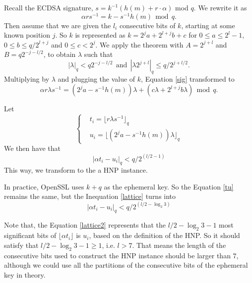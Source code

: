 Recall the ECDSA signature, $s = k^{-1} (h(m) + r\cdot\alpha)$ mod $q$.
We rewrite it as
\begin{equation}
\label{sig}
\alpha rs^{-1} = k - s^{-1}h(m)  \ \  \text{mod} \ \ q.
\end{equation}
Then assume that we are given the $l_i$ consecutive bits of $k$, starting at some known position $j$.
 So $k$ is represented as $k = 2^{j}a + 2^{l+j}b +c$ for $0 \leq a \leq 2^l -1$, $0\leq b \leq q/2^{l+j}$ and $0 \leq c < 2^j$.
 We apply the theorem with $A = 2^{j+l}$ and $B = q2^{-j-l/2}$, to obtain $\lambda$ such that
$$
|\lambda |_q < q2^{-j-l/2}  \ \  \text{and} \ \  |\lambda 2^{j+l}|_q \leq q/2^{j+l/2} .
$$
Multiplying by $\lambda$ and plugging the value of $k$, Equation \ref{sig} transformed to
$$
\alpha r\lambda s^{-1} = (2^{j}a - s^{-1}h(m))\lambda +(c\lambda + 2^{l+j}b\lambda)  \ \  \text{mod} \ \ q.
$$

 Let
 \begin{equation}
 \label{tu}
 \left\{
 \begin{aligned}
 	&t_i = \lfloor r\lambda s^{-1} \rfloor_q    \\
 	&u_i = \lfloor (2^{j}a - s^{-1}h(m))\lambda \rfloor_q
 \end{aligned}
 \right.
 \end{equation}
We then have that
 \begin{equation}
\label{lattice}
    |\alpha t_i - u_i|_q < q/2^{(l/2-1)}
\end{equation}
This way, we transform to the a HNP instance.

In practice, OpenSSL uses $k+q$ as the ephemeral key. So the Equation \ref{tu} remains the same, but the Inequation \ref{lattice} turns into
 \begin{equation}
\label{lattice2}
    |\alpha t_i - u_i|_q < q/2^{(l/2-\log_{2}{3})}
\end{equation}

Note that, the Equation \ref{lattice2} represents that the $l/2-\log_{2}{3} -1$ most significant bits of $\lfloor\alpha t_i\rfloor$ is $u_i$, based on the definition of the HNP.
So it should satisfy that $l/2-\log_{2}{3} -1 \geq 1$, i.e. $l > 7$.
That means the length of the consecutive bits used to  construct the HNP instance should be larger than $7$,
although we could use all the partitions of the consecutive bits of the ephemeral key in theory.

